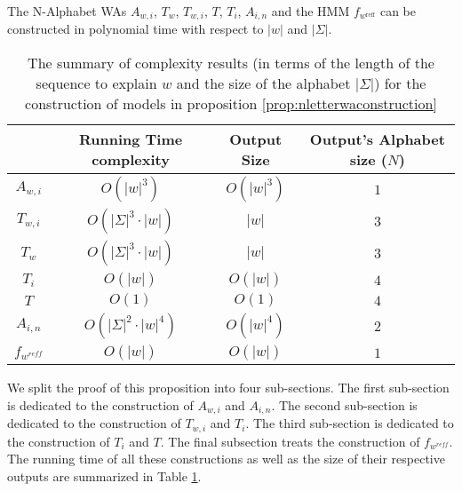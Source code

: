 \begin{unumberedproposition}
 The N-Alphabet WAs $A_{w,i}$, $T_{w}$, $T_{w,i}$, $T$, $T_{i}$, $A_{i,n}$ and the HMM $f_{w^{\text{reff}}}$ can be constructed in polynomial time with respect to $|w|$ and $|\Sigma|$.
\end{unumberedproposition}
\begin{table}[ht]
    \centering
        \caption{The summary of complexity results (in terms of the length of the sequence to explain $w$ and the size of the alphabet $|\Sigma|$) for the construction of models in proposition \ref{prop:nletterwaconstruction}}
    \begin{tabular}{|c|c|c|c|}
        \hline
         & \textbf{Running Time complexity} & \textbf{Output Size} & \textbf{Output's Alphabet size ($N$)}  \\ \hline
        $A_{w,i}$ & $O(|w|^{3})$ & $O(|w|^{3})$ & $1$  \\ \hline
        $T_{w,i}$ &  $O(|\Sigma|^{3} \cdot |w|)$ & $|w|$ & $3$  \\ \hline
        $T_{w}$ &$O(|\Sigma|^{3} \cdot |w|)$ & $|w|$ & $3$  \\ \hline
        $T_{i}$ & $O(|w|)$ & $O(|w|)$ & $4$  \\ \hline
        $T$ & $O(1)$ & $O(1)$ & $4$ \\ \hline
        $A_{i,n}$ &  $O(|\Sigma|^{2} \cdot |w|^{4})$ & $O(|w|^{4})$ & $2$  \\ \hline
        $f_{w^{reff}}$ & $O(|w|)$ & $O(|w|)$ & $1$  \\ \hline
    \end{tabular}
    \label{app:fig:prop6}
\end{table}
We split the proof of this proposition into four sub-sections. The first sub-section is dedicated to the construction of $A_{w,i}$ and $A_{i,n}$. The second sub-section is dedicated to the construction of $T_{w,i}$ and $T_{i}$. The third sub-section is dedicated to the construction of $T_{i}$ and $T$. The final subsection treats the construction of $f_{w^{reff}}$. The running time of all these constructions as well as the size of their respective outputs are summarized in Table \ref{app:fig:prop6}.  

